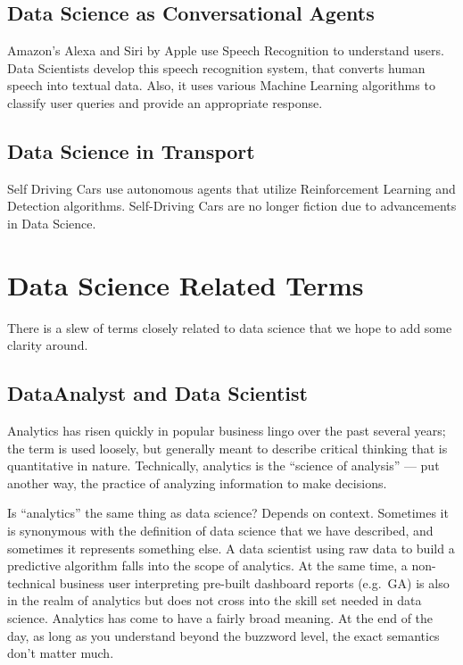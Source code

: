 \documentclass[
]{book}
\begin{document}
\hypertarget{data-science-as-conversational-agents}{%
\subsection*{Data Science as Conversational Agents}\label{data-science-as-conversational-agents}}


Amazon's Alexa and Siri by Apple use Speech Recognition to understand users. Data Scientists develop this speech recognition system, that converts human speech into textual data. Also, it uses various Machine Learning algorithms to classify user queries and provide an appropriate response.

\hypertarget{data-science-in-transport}{%
\subsection*{Data Science in Transport}\label{data-science-in-transport}}


Self Driving Cars use autonomous agents that utilize Reinforcement Learning and Detection algorithms. Self-Driving Cars are no longer fiction due to advancements in Data Science.

\hypertarget{data-science-related-terms}{%
\section{Data Science Related Terms}\label{data-science-related-terms}}

There is a slew of terms closely related to data science that we hope to add some clarity around.

\hypertarget{dataanalyst-and-data-scientist}{%
\subsection*{DataAnalyst and Data Scientist}\label{dataanalyst-and-data-scientist}}


Analytics has risen quickly in popular business lingo over the past several years; the term is used loosely, but generally meant to describe critical thinking that is quantitative in nature. Technically, analytics is the ``science of analysis'' --- put another way, the practice of analyzing information to make decisions.

Is ``analytics'' the same thing as data science? Depends on context. Sometimes it is synonymous with the definition of data science that we have described, and sometimes it represents something else. A data scientist using raw data to build a predictive algorithm falls into the scope of analytics. At the same time, a non-technical business user interpreting pre-built dashboard reports (e.g.~GA) is also in the realm of analytics but does not cross into the skill set needed in data science. Analytics has come to have a fairly broad meaning. At the end of the day, as long as you understand beyond the buzzword level, the exact semantics don't matter much.
\end{document}
